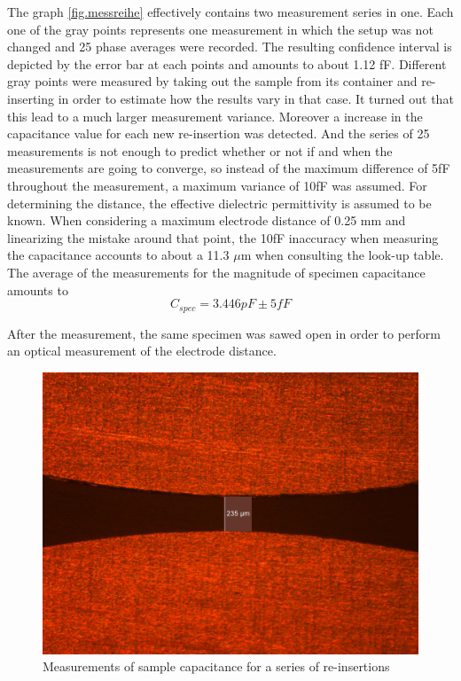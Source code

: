 The graph \ref{fig.messreihe} effectively contains two measurement series in one. Each one of the gray points represents one measurement in which
the setup was not changed and 25 phase averages were recorded. The resulting confidence interval is depicted by the error bar at each points
and amounts to about 1.12 fF.
\newline
Different gray points were measured by taking out the sample from its container and re-inserting in order to estimate how the results vary in that case.
It turned out that this lead to a much larger measurement variance. Moreover a increase in the capacitance value for each new re-insertion was detected.
And the series of 25 measurements is not enough to predict whether or not if and when the measurements are going to converge, so instead of the maximum difference of
5fF throughout the measurement, a maximum variance of 10fF was assumed.
\newline
For determining the distance, the 
effective dielectric permittivity is assumed to be known. When
considering a maximum electrode distance of 0.25 mm and linearizing the mistake around that point, the 10fF inaccuracy
when measuring the capacitance accounts to about a 11.3 $\mu$m when consulting the look-up table.
The average of the measurements for the magnitude of specimen capacitance amounts to
\begin{equation}
 C_{spec}=3.446pF \pm 5fF
\end{equation}

After the measurement, the same specimen was sawed open in order to perform an optical measurement of the electrode distance.


\begin{figure}[ht]
	\centering
	\includegraphics[scale=0.12]{figures/Results/Capacitance_Measure/Sample1_scale.jpg}		
	\caption[Kurze Abbildungsbeschreibung]{Measurements of sample capacitance for a series of re-insertions} 
	\label{fig.opticalmeasurement}
\end{figure}

